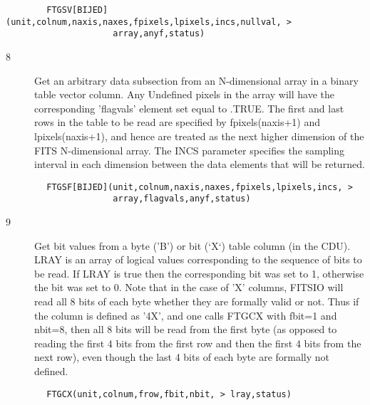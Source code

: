 \documentclass[11pt]{book}
\begin{document}
\begin{verbatim}
        FTGSV[BIJED](unit,colnum,naxis,naxes,fpixels,lpixels,incs,nullval, >
                     array,anyf,status)
\end{verbatim}

\begin{description}
\item[8 ] Get an arbitrary data subsection from an N-dimensional array
    in a binary table vector column.  Any Undefined
    pixels in the array will have the corresponding 'flagvals'
    element set equal to .TRUE.   The first and last rows in the table
    to be read are specified by fpixels(naxis+1) and lpixels(naxis+1),
    and hence are treated as the next higher dimension of the FITS
    N-dimensional array.  The INCS parameter specifies the sampling
    interval in each dimension between the data elements that will be
   returned.
\end{description}

\begin{verbatim}
        FTGSF[BIJED](unit,colnum,naxis,naxes,fpixels,lpixels,incs, >
                     array,flagvals,anyf,status)
\end{verbatim}

\begin{description}
\item[9 ] Get bit values from a byte ('B') or bit (`X`) table column (in the
    CDU).  LRAY is an array of logical values corresponding to the
    sequence of bits to be read.  If LRAY is true then the
    corresponding bit was set to 1, otherwise the bit was set to 0.
    Note that in the case of 'X' columns, FITSIO will read  all 8 bits
    of each byte whether they are formally valid or not.  Thus if the
    column is defined as '4X', and one calls FTGCX with  fbit=1 and
    nbit=8, then all 8 bits will be read from the first byte (as
    opposed to reading the first 4 bits from the first row and then the
    first 4 bits from the next row), even though the last 4 bits of
   each byte are formally not defined.
\end{description}

\begin{verbatim}
        FTGCX(unit,colnum,frow,fbit,nbit, > lray,status)
\end{verbatim}
\end{document}

